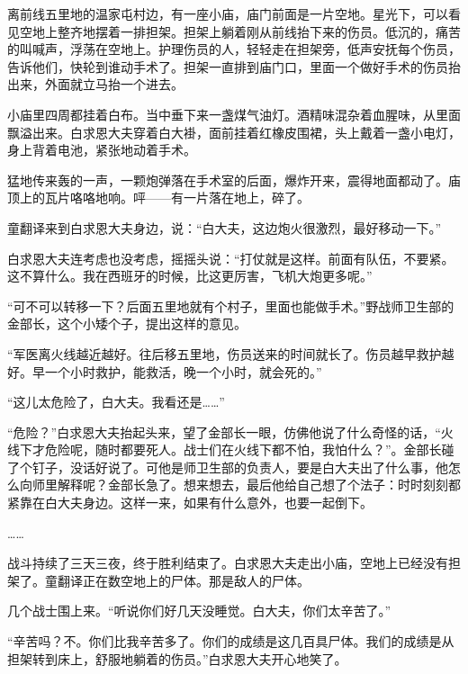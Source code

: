 \documentclass[12pt,UTF-8,openany]{ctexbook}
\begin{document}
\begin{Large}
    
    离前线五里地的温家屯村边，有一座小庙，庙门前面是一片空地。星光下，可以看见空地上整齐地摆着一排担架。担架上躺着刚从前线抬下来的伤员。低沉的，痛苦的叫喊声，浮荡在空地上。护理伤员的人，轻轻走在担架旁，低声安抚每个伤员，告诉他们，快轮到谁动手术了。担架一直排到庙门口，里面一个做好手术的伤员抬出来，外面就立马抬一个进去。
    
    小庙里四周都挂着白布。当中垂下来一盏煤气油灯。酒精味混杂着血腥味，从里面飘溢出来。白求恩大夫穿着白大褂，面前挂着红橡皮围裙，头上戴着一盏小电灯，身上背着电池，紧张地动着手术。
    
    猛地传来轰的一声，一颗炮弹落在手术室的后面，爆炸开来，震得地面都动了。庙顶上的瓦片咯咯地响。呯——有一片落在地上，碎了。
    
    童翻译来到白求恩大夫身边，说：“白大夫，这边炮火很激烈，最好移动一下。”
    
    白求恩大夫连考虑也没考虑，摇摇头说：“打仗就是这样。前面有队伍，不要紧。这不算什么。我在西班牙的时候，比这更厉害，飞机大炮更多呢。”
    
    “可不可以转移一下？后面五里地就有个村子，里面也能做手术。”野战师卫生部的金部长，这个小矮个子，提出这样的意见。
    
    “军医离火线越近越好。往后移五里地，伤员送来的时间就长了。伤员越早救护越好。早一个小时救护，能救活，晚一个小时，就会死的。”
    
    “这儿太危险了，白大夫。我看还是……”
    
    “危险？”白求恩大夫抬起头来，望了金部长一眼，仿佛他说了什么奇怪的话，“火线下才危险呢，随时都要死人。战士们在火线下都不怕，我怕什么？”。金部长碰了个钉子，没话好说了。可他是师卫生部的负责人，要是白大夫出了什么事，他怎么向师里解释呢？金部长急了。想来想去，最后他给自己想了个法子：时时刻刻都紧靠在白大夫身边。这样一来，如果有什么意外，也要一起倒下。
    
    ……
    
    战斗持续了三天三夜，终于胜利结束了。白求恩大夫走出小庙，空地上已经没有担架了。童翻译正在数空地上的尸体。那是敌人的尸体。
    
    几个战士围上来。“听说你们好几天没睡觉。白大夫，你们太辛苦了。”
    
    “辛苦吗？不。你们比我辛苦多了。你们的成绩是这几百具尸体。我们的成绩是从担架转到床上，舒服地躺着的伤员。”白求恩大夫开心地笑了。
    
\end{Large}


\newpage
\end{document}

